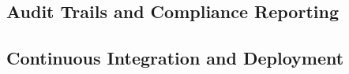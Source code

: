 
\subsection{Audit Trails and Compliance Reporting}




\subsection{Continuous Integration and Deployment}



